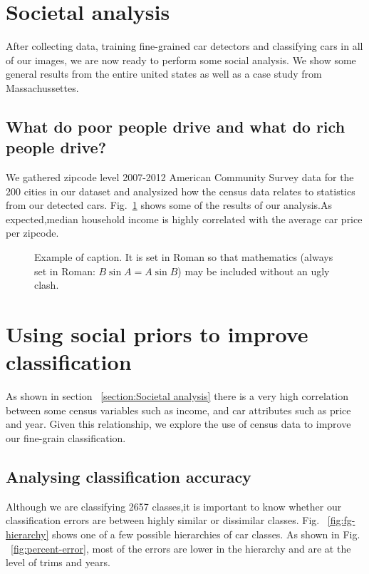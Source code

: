 \documentclass[10pt,twocolumn,letterpaper]{article}
\begin{document}
\section{Societal analysis}
After collecting data, training fine-grained car detectors and classifying cars in all of our images, we are now ready to perform some social analysis. We show some general results from the entire united states as well as a case study from Massachussettes.

\subsection{What do poor people drive and what do rich people drive?}
We gathered zipcode level 2007-2012 American Community Survey data for the 200 cities in our dataset and analysized how the census data relates to statistics from our detected cars. Fig.~\ref{fig:corrs} shows some of the results of our analysis.As expected,median household income is highly correlated with the average car price per zipcode.   
\begin{figure}[t]
\begin{center}
\fbox{\rule{0pt}{2in} \rule{0.9\linewidth}{0pt}}
\end{center}
   \caption{Example of caption.  It is set in Roman so that mathematics
   (always set in Roman: $B \sin A = A \sin B$) may be included without an
   ugly clash.}
\label{fig:corrs}
\end{figure}

\section{Using social priors to improve classification}
As shown in section ~\ref{section:Societal analysis} there is a very high correlation between some census variables such as income, and car attributes such as price and year. Given this relationship, we explore the use of census data to improve our fine-grain classification.
\subsection{Analysing classification accuracy}
Although we are classifying 2657 classes,it is important to know whether our classification errors are between highly similar or dissimilar classes. Fig. ~\ref{fig:fg-hierarchy} shows one of a few possible hierarchies of car classes. As shown in Fig. ~\ref{fig:percent-error}, most of the errors are lower in the hierarchy and are at the level of trims and years.  
\end{document}
